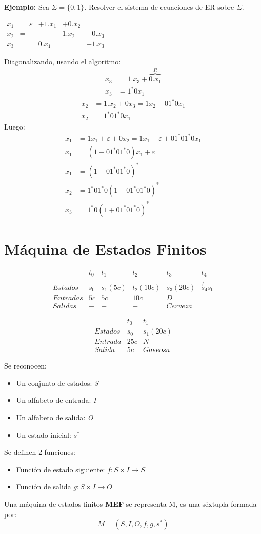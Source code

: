 \textbf{Ejemplo: }Sea $\Sigma=\{ 0,1\}$. Resolver el sistema de ecuaciones de ER sobre $\Sigma$.
\begin{center}
$\begin{array}{lllll}
x_1	&=\varepsilon	&+1.x_1	&+0.x_2	&  \\
x_2	&=				&		&1.x_2 	&+0.x_3 \\
x_3	&=				&0.x_1	&		&+1.x_3
\end{array}$
\end{center}
Diagonalizando, usando el algoritmo:
\begin{align*}
x_3	&=1.x_3+ \overbrace{0.x_1}^R\\
x_3	&=1^*0x_1
\end{align*}
\begin{align*}
x_2	&=1.x_2+0x_3 = 1x_2+01^*0x_1\\
x_2	&=1^*01^* 0x_1
\end{align*}
Luego:
\begin{align*}
x_1	&=1x_1+\varepsilon+0x_2=1x_1+\varepsilon+01^* 01^*0x_1\\
x_1	&=(1+01^* 01^* 0)x_1 +\varepsilon\\
x_1	&=(1+01^*01^*0)^*\\
x_2	&=1^*01^*0(1+01^*01^*0)^*\\
x_3	&=1^*0(1+01^*01^*0)^*
\end{align*}

\section{Máquina de Estados Finitos}
$$\begin{array}{l|c|c|c|c|c}
	  		&t_0	&t_1	&t_2		&t_3		&t_4			\\ \hline
Estados   	&s_0	&s_1(5c)&t_2(10c)	&s_3(20c)	&\not{s_4}s_0 	\\ \hline
Entradas  	&5c		&5c		&10c		&D			&		 		\\ \hline
Salidas   	&-		&-		&-			&Cerveza	& 
\end{array}$$


$$\begin{array}{l|c|c}
		&t_0		&t_1		\\ \hline
Estados	&s_0		&s_1(20c)	\\ \hline
Entrada	&25c		&N			\\ \hline
Salida	&5c			&Gaseosa
\end{array}$$

Se reconocen:
\begin{itemize}
 \item Un conjunto de estados: \textit{S}
 \item Un alfabeto de entrada: \textit{I}
 \item Un alfabeto de salida: \textit{O}
 \item Un estado inicial: $s^*$
\end{itemize}

Se definen 2 funciones:
\begin{itemize}
 \item Función de estado siguiente: $f:S\times I \rightarrow S$
 \item Función de salida $g:S\times I \rightarrow O$
\end{itemize}

Una máquina de estados finitos \textbf{MEF} se representa M, es una séxtupla formada por:
$$M=(S,I,O,f,g,s^*)$$

